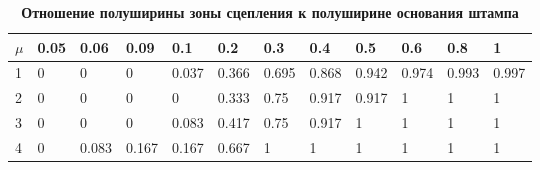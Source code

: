 \begin{table}[h!] \centering \small

\caption*{\bf Отношение полуширины зоны сцепления к полуширине основания штампа}

\vspace{-3mm}

\begin{tabular}{|p{0.1in}|p{0.28in}|p{0.28in}|p{0.28in}|p{0.28in}|p{0.28in}|p{0.28in}|p{0.28in}|p{0.28in}|p{0.28in}|p{0.28in}|p{0.28in}|} \hline

$\mu $ &0.05& 0.06 & 0.09 & 0.1 & 0.2 & 0.3 & 0.4 & 0.5 & 0.6 & 0.8 & 1 \\ \hline

1 & 0 & 0 & 0 & 0.037 & 0.366 & 0.695 & 0.868 & 0.942 & 0.974 & 0.993 & 0.997 \\ \hline

2 & 0 & 0 & 0 & 0 & 0.333 & 0.75 & 0.917 & 0.917 & 1 & 1 & 1 \\ \hline

3 & 0 & 0 & 0 & 0.083 & 0.417 & 0.75 & 0.917 & 1 & 1 & 1 & 1 \\ \hline

4 & 0 & 0.083 & 0.167 & 0.167 & 0.667 & 1 & 1 & 1 & 1 & 1 & 1 \\ \hline

\end{tabular}

\end{table}











